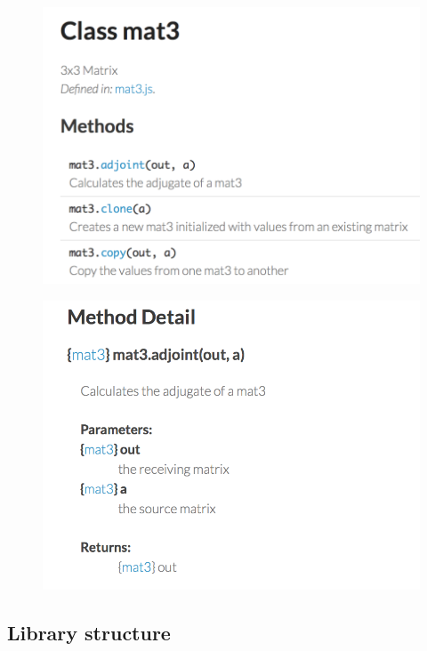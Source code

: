 \begin{figure}[htbp]
\centering
\includegraphics{mat3.png}
\caption{}
\end{figure}

\begin{figure}[htbp]
\centering
\includegraphics{mat3-adjoint.png}
\caption{}
\end{figure}

\subsection{Library structure}\label{library-structure}

